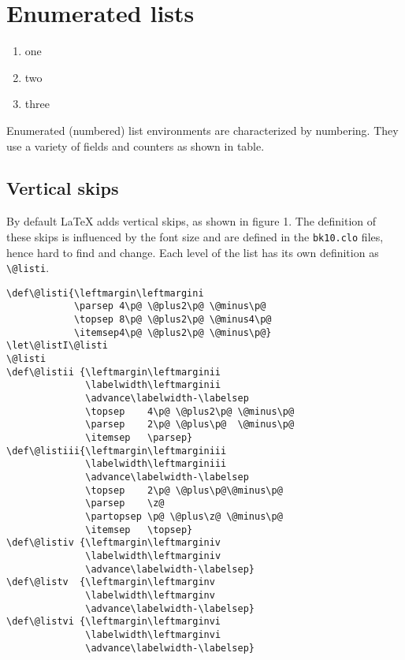 \section{Enumerated lists}


\begin{enumerate}
\item one
\item two
\item three
\end{enumerate}

Enumerated (numbered) list environments are characterized by numbering. They use a variety of fields and counters as shown in table.

\subsection{Vertical skips}

By default LaTeX adds vertical skips, as shown in figure 1. The definition of these skips is influenced by the font size and are defined in the \texttt{bk10.clo} files, hence hard to find and change. Each level of the list has its own definition as \lstinline{\@listi}.

\bigskip
{}

\begin{tcolorbox}[title=Extract from bk10.clo]
\begin{lstlisting}
\def\@listi{\leftmargin\leftmargini
            \parsep 4\p@ \@plus2\p@ \@minus\p@
            \topsep 8\p@ \@plus2\p@ \@minus4\p@
            \itemsep4\p@ \@plus2\p@ \@minus\p@}
\let\@listI\@listi
\@listi
\def\@listii {\leftmargin\leftmarginii
              \labelwidth\leftmarginii
              \advance\labelwidth-\labelsep
              \topsep    4\p@ \@plus2\p@ \@minus\p@
              \parsep    2\p@ \@plus\p@  \@minus\p@
              \itemsep   \parsep}
\def\@listiii{\leftmargin\leftmarginiii
              \labelwidth\leftmarginiii
              \advance\labelwidth-\labelsep
              \topsep    2\p@ \@plus\p@\@minus\p@
              \parsep    \z@
              \partopsep \p@ \@plus\z@ \@minus\p@
              \itemsep   \topsep}
\def\@listiv {\leftmargin\leftmarginiv
              \labelwidth\leftmarginiv
              \advance\labelwidth-\labelsep}
\def\@listv  {\leftmargin\leftmarginv
              \labelwidth\leftmarginv
              \advance\labelwidth-\labelsep}
\def\@listvi {\leftmargin\leftmarginvi
              \labelwidth\leftmarginvi
              \advance\labelwidth-\labelsep}
\end{lstlisting}
\end{tcolorbox}


